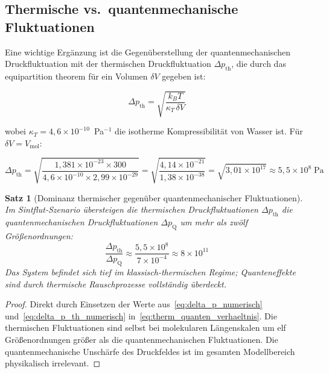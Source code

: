 ﻿\documentclass[12pt,a4paper]{report}
\newtheorem{theorem}{Satz}[chapter]
\begin{document}
\subsection{Thermische vs.\ quantenmechanische Fluktuationen}

Eine wichtige Ergänzung ist die Gegenüberstellung der quantenmechanischen Druckfluktuation mit der thermischen Druckfluktuation $\Delta p_\mathrm{th}$, die durch das equipartition theorem für ein Volumen $\delta V$ gegeben ist:

\begin{equation}
	\Delta p_\mathrm{th} = \sqrt{\frac{k_B T}{\kappa_T\,\delta V}}
	\label{eq:delta_p_thermisch}
\end{equation}

wobei $\kappa_T = 4{,}6\times10^{-10}$~Pa$^{-1}$ die isotherme Kompressibilität von Wasser ist. Für $\delta V = V_\mathrm{mol}$:

\begin{equation}
	\Delta p_\mathrm{th} = \sqrt{\frac{1{,}381\times10^{-23}\times300}{4{,}6\times10^{-10}\times2{,}99\times10^{-29}}} = \sqrt{\frac{4{,}14\times10^{-21}}{1{,}38\times10^{-38}}} = \sqrt{3{,}01\times10^{17}} \approx 5{,}5\times10^{8}\;\text{Pa}
	\label{eq:delta_p_th_numerisch}
\end{equation}

\begin{theorem}[Dominanz thermischer gegenüber quantenmechanischer Fluktuationen]
	\label{thm:therm_dominanz}
	Im Sintflut-Szenario übersteigen die thermischen Druckfluktuationen $\Delta p_\mathrm{th}$ die quantenmechanischen Druckfluktuationen $\Delta p_\mathrm{Q}$ um mehr als zwölf Größenordnungen:
	\begin{equation}
		\frac{\Delta p_\mathrm{th}}{\Delta p_\mathrm{Q}} \approx \frac{5{,}5\times10^{8}}{7\times10^{-4}} \approx 8\times10^{11}
		\label{eq:therm_quanten_verhaeltnis}
	\end{equation}
	Das System befindet sich tief im klassisch-thermischen Regime; Quanteneffekte sind durch thermische Rauschprozesse vollständig überdeckt.
\end{theorem}

\begin{proof}
	Direkt durch Einsetzen der Werte aus~\eqref{eq:delta_p_numerisch} und~\eqref{eq:delta_p_th_numerisch} in~\eqref{eq:therm_quanten_verhaeltnis}. Die thermischen Fluktuationen sind selbst bei molekularen Längenskalen um elf Größenordnungen größer als die quantenmechanischen Fluktuationen. Die quantenmechanische Unschärfe des Druckfeldes ist im gesamten Modellbereich physikalisch irrelevant.
\end{proof}
\end{document}
